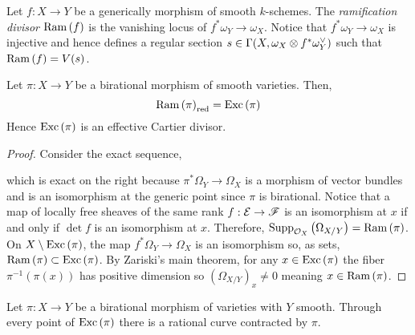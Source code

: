 \documentclass[12pt]{article}
\begin{document}
\begin{defn}
Let $f : X \to Y$ be a generically \etale morphism of smooth $k$-schemes. The \textit{ramification divisor} $\mathrm{Ram}\left(f\right)$ is the vanishing locus of $f^* \omega_Y \to \omega_X$. Notice that $f^* \omega_Y \to \omega_X$ is injective and hence defines a regular section $s \in \Gamma(X, \omega_X \otimes f^* \omega_Y^\vee)$ such that $\mathrm{Ram}\left(f\right) = V(s)$.
\end{defn}

\begin{prop}
Let $\pi : X \to Y$ be a birational morphism of smooth varieties. Then, \[ \mathrm{Ram}\left(\pi\right)_{\mathrm{red}} = \mathrm{Exc}\left(\pi\right) \]
Hence $\mathrm{Exc}\left(\pi\right)$ is an effective Cartier divisor.
\end{prop}

\begin{proof}
Consider the exact sequence,
\begin{center}
\end{center}
which is exact on the right because $\pi^* \Omega_Y \to \Omega_X$ is a morphism of vector bundles and is an isomorphism at the generic point since $\pi$ is birational. Notice that a map of locally free sheaves of the same rank $f : \mathcal{E} \to \mathscr{F}$ is an isomorphism at $x$ if and only if $\det{f}$ is an isomorphism at $x$. Therefore, $\mathrm{Supp}_{\mathcal{O}_{X}}\left(\Omega_{X/Y} \right) = \mathrm{Ram}\left(\pi\right)$. On $X \setminus \mathrm{Exc}\left(\pi\right)$, the map $f^* \Omega_Y \to \Omega_X$ is an isomorphism so, as sets, $\mathrm{Ram}\left(\pi\right) \subset \mathrm{Exc}\left(\pi\right)$. By Zariski's main theorem, for any $x \in \mathrm{Exc}\left(\pi\right)$ the fiber $\pi^{-1}(\pi(x))$ has positive dimension so $(\Omega_{X/Y})_x \neq 0$ meaning $x \in \mathrm{Ram}\left(\pi\right)$. 
\end{proof}

\begin{prop}
Let $\pi : X \to Y$ be a birational morphism of varieties with $Y$ smooth. Through every point of $\mathrm{Exc}\left(\pi\right)$ there is a rational curve contracted by $\pi$.
\end{prop}
\end{document}
